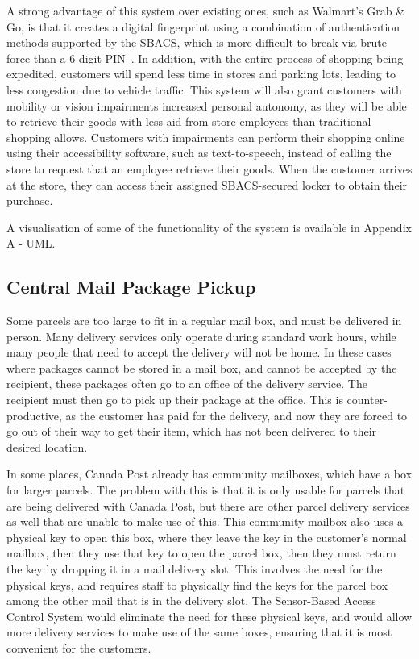 \documentclass{article}
\begin{document}
A strong advantage of this system over existing ones, such as Walmart's Grab \& Go, is that it creates a digital 
fingerprint using a combination of authentication methods supported by the SBACS, which is more difficult to 
break via brute force than a 6-digit PIN~\autocite{WALMART}. In addition, with the entire process of shopping being 
expedited, customers will spend less time in stores and parking lots, leading to less congestion due to vehicle 
traffic. This system will also grant customers with mobility or vision impairments increased personal autonomy, as 
they will be able to retrieve their goods with less aid from store employees than traditional shopping allows. Customers
with impairments can perform their shopping online using their accessibility software, such as text-to-speech, instead 
of calling the store to request that an employee retrieve their goods. When the customer arrives at the store, they can
access their assigned SBACS-secured locker to obtain their purchase. \hfill \break

\noindent A visualisation of some of the functionality of the system is available in Appendix A - UML.

\subsection{Central Mail Package Pickup}

Some parcels are too large to fit in a regular mail box, and must be delivered in person. Many delivery services only 
operate during standard work hours, while many people that need to accept the delivery will not be home. In these cases 
where packages cannot be stored in a mail box, and cannot be accepted by the recipient, these packages often go to an office 
of the delivery service. The recipient must then go to pick up their package at the office. This is counter-productive, 
as the customer has paid for the delivery, and now they are forced to go out of their way to get their item, which has not 
been delivered to their desired location.

In some places, Canada Post already has community mailboxes, which have a box for larger parcels. The problem with this
is that it is only usable for parcels that are being delivered with Canada Post, but there are other parcel delivery
services as well that are unable to make use of this. This community mailbox also uses a physical key to open this box,
where they leave the key in the customer's normal mailbox, then they use that key to open the parcel box, then they must 
return the key by dropping it in a mail delivery slot. This involves the need for the physical keys, and requires staff to
physically find the keys for the parcel box among the other mail that is in the delivery slot. The Sensor-Based Access 
Control System would eliminate the need for these physical keys, and would allow more delivery services to make use of
the same boxes, ensuring that it is most convenient for the customers.
\end{document}
